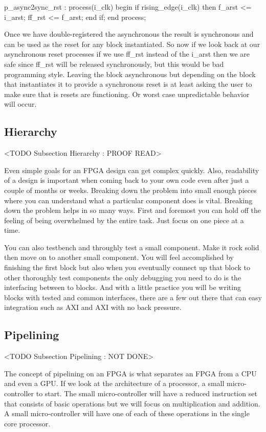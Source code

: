 \begin{VHDLlisting}[tabsize=4]
p_async2sync_rst : process(i_clk)
begin
	if rising_edge(i_clk) then
		f_arst <= i_arst;
		ff_rst <= f_arst;
	end if;
end process;
\end{VHDLlisting}
		
Once we have double-registered the asynchronous the result is synchronous and can be used as the reset for any block instantiated. So now if we look back at our asynchronous reset processes if we use ff\_rst instead of the i\_arst then we are safe since ff\_rst will be released synchronously, but this would be bad programming style. Leaving the block asynchronous but depending on the block that instantiates it to provide a synchronous reset is at least asking the user to make sure that is resets are functioning. Or worst case unpredictable behavior will occur. 
		
		
\subsection{Hierarchy} 
	<TODO Subsection Hierarchy : PROOF READ>

Even simple goals for an \ac{FPGA} design can get complex quickly. Also, readability of a design is important when coming back to your own code even after just a couple of months or weeks. Breaking down the problem into small enough pieces where you can understand what a particular component does is vital. Breaking down the problem helps in so many ways. First and foremost you can hold off the feeling of being overwhelmed by the entire task. Just focus on one piece at a time. 

You can also testbench and throughly test a small component. Make it rock solid then move on to another small component. You will feel accomplished by finishing the first block but also when you eventually connect up that block to other thoroughly test components the only debugging you need to do is the interfacing between to blocks. And with a little practice you will be writing blocks with tested and common interfaces, there are a few out there that can easy integration such as \ac{AXI} and \ac{AXI} with no back pressure. 
	
\subsection{Pipelining}
	<TODO Subsection Pipelining : NOT DONE>
	
The concept of pipelining on an \ac{FPGA} is what separates an \ac{FPGA} from a \ac{CPU} and even a \ac{GPU}. If we look at the architecture of a processor, a small micro-controller to start. The small micro-controller will have a reduced instruction set that consists of basic operations but we will focus on multiplication and addition. A small micro-controller will have one of each of these operations in the single core processor.

